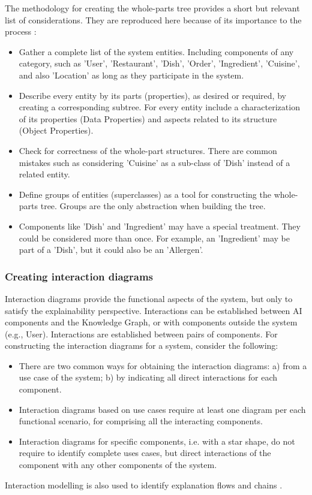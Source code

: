 \documentclass[conference]{IEEEtran}
\begin{document}
The methodology for creating the whole-parts tree provides a short but relevant list of considerations. They are reproduced here because of its importance to the process \cite{ref1}:
\begin{itemize}
  \item Gather a complete list of the system entities. Including components of any category, such as 'User', 'Restaurant', 'Dish', 'Order', 'Ingredient', 'Cuisine', and also 'Location' as long as they participate in the system.
  \item Describe every entity by its parts (properties), as desired or required, by creating a corresponding subtree. For every entity include a characterization of its properties (Data Properties) and aspects related to its structure (Object Properties).
  \item Check for correctness of the whole-part structures. There are common mistakes such as considering 'Cuisine' as a sub-class of 'Dish' instead of a related entity.
  \item Define groups of entities (superclasses) as a tool for constructing the whole-parts tree. Groups are the only abstraction when building the tree.
  \item Components like 'Dish' and 'Ingredient' may have a special treatment. They could be considered more than once. For example, an 'Ingredient' may be part of a 'Dish', but it could also be an 'Allergen'.
\end{itemize}

\subsubsection{Creating interaction diagrams}
Interaction diagrams provide the functional aspects of the system, but only to satisfy the explainability perspective. Interactions can be established between AI components and the Knowledge Graph, or with components outside the system (e.g., User). Interactions are established between pairs of components. For constructing the interaction diagrams for a system, consider the following:
\begin{itemize}
  \item There are two common ways for obtaining the interaction diagrams: a) from a use case of the system; b) by indicating all direct interactions for each component.
  \item Interaction diagrams based on use cases require at least one diagram per each functional scenario, for comprising all the interacting components.
  \item Interaction diagrams for specific components, i.e. with a star shape, do not require to identify complete uses cases, but direct interactions of the component with any other components of the system.
\end{itemize}
Interaction modelling is also used to identify explanation flows and chains \cite{ref11}.
\end{document}

